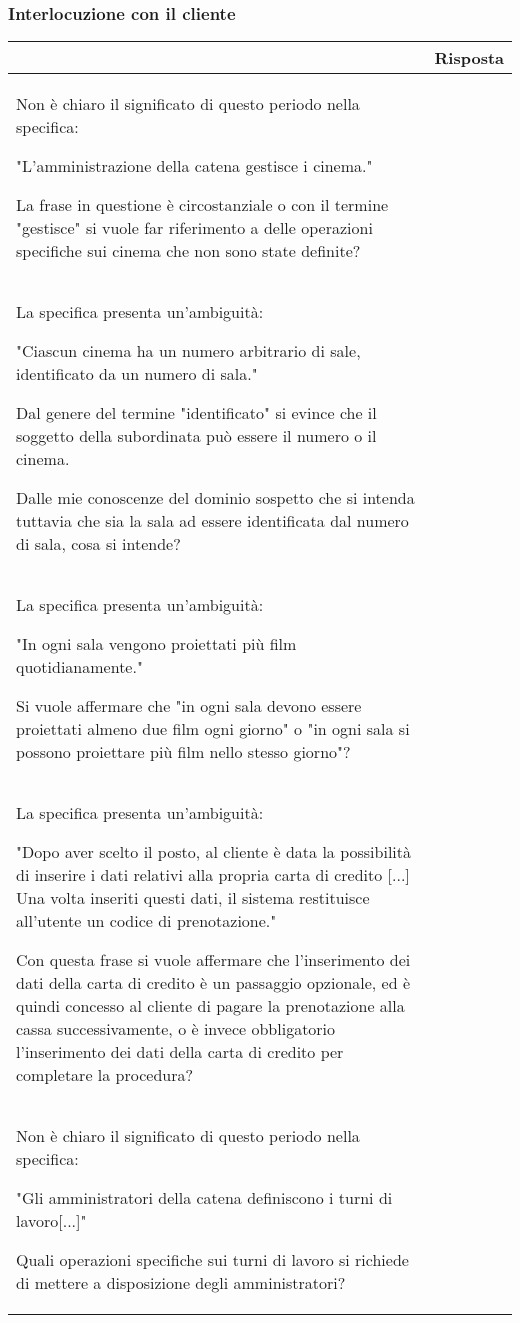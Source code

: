 \pagebreak
\subsubsection*{Interlocuzione con il cliente}

\begin{tabularx}{\linewidth}{|X|X|}
    \hline
    \rowcolor{tblhdrcolor}
    \multicolumn{1}{|c|}{\textbf{Messaggio}}
     & \multicolumn{1}{|c|}{\textbf{Risposta}}
    \\\hline
    Non è chiaro il significato di questo periodo nella specifica:

    "L'amministrazione della catena gestisce i cinema."

    La frase in questione è circostanziale o con il termine "gestisce" si vuole
    far riferimento a delle operazioni specifiche sui cinema che non sono
    state definite?
     & \hfill
    \\\hline
    La specifica presenta un'ambiguità:

    "Ciascun cinema ha un numero arbitrario di sale,
    identificato da un numero di sala."

    Dal genere del termine "identificato" si evince che il soggetto della
    subordinata può essere il numero o il cinema.

    Dalle mie conoscenze del dominio sospetto che si intenda tuttavia
    che sia la sala ad essere identificata dal numero di sala,
    cosa si intende?
     & \hfill
    \\\hline
    La specifica presenta un'ambiguità:

    "In ogni sala vengono proiettati più film quotidianamente."

    Si vuole affermare che
    "in ogni sala devono essere proiettati almeno due film ogni giorno"
    o
    "in ogni sala si possono proiettare più film nello stesso giorno"?
     & \hfill
    \\\hline
    La specifica presenta un'ambiguità:

    "Dopo aver scelto il posto, al cliente è data la possibilità di inserire
    i dati relativi alla propria carta di credito [...] Una volta inseriti
    questi dati, il sistema restituisce all’utente un codice di prenotazione."

    Con questa frase si vuole affermare che l'inserimento dei dati della carta
    di credito è un passaggio opzionale, ed è quindi concesso al cliente
    di pagare la prenotazione alla cassa successivamente,
    o è invece obbligatorio l'inserimento dei dati della carta di credito per
    completare la procedura?
     & \hfill
    \\\hline
    Non è chiaro il significato di questo periodo nella specifica:

    "Gli amministratori della catena definiscono i turni di lavoro[...]"

    Quali operazioni specifiche sui turni di lavoro si richiede di mettere
    a disposizione degli amministratori?
     & \hfill
    \\\hline
\end{tabularx}
\pagebreak

